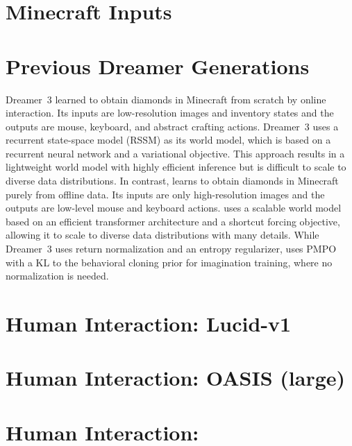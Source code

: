 \enlargethispage{\baselineskip}
\vspace*{-9ex}
\section{Minecraft Inputs}
\vspace*{-1ex}


\section{Previous Dreamer Generations}
\vspace*{-1ex}
Dreamer~3\citep{dreamerv3} learned to obtain diamonds in Minecraft from scratch by online interaction.
Its inputs are low-resolution images and inventory states and the outputs are mouse, keyboard, and abstract crafting actions.
Dreamer~3 uses a recurrent state-space model (RSSM) \citep{hafner2018planet} as its world model, which is based on a recurrent neural network and a variational objective.
This approach results in a lightweight world model with highly efficient inference but is difficult to scale to diverse data distributions.
In contrast, \method learns to obtain diamonds in Minecraft purely from offline data.
Its inputs are only high-resolution images and the outputs are low-level mouse and keyboard actions.
\method uses a scalable world model based on an efficient transformer architecture and a shortcut forcing objective, allowing it to scale to diverse data distributions with many details.
While Dreamer~3 uses return normalization and an entropy regularizer, \method uses PMPO with a KL to the behavioral cloning prior for imagination training, where no normalization is needed.
\vspace*{1ex}

\clearpage

\enlargethispage{\baselineskip}
\vspace*{-10ex}
\section{Human Interaction: Lucid-v1}
\vspace*{-2ex}

\vspace*{-2ex}
\clearpage

\enlargethispage{\baselineskip}
\vspace*{-10ex}
\section{Human Interaction: OASIS (large)}
\vspace*{-2ex}

\vspace*{-2ex}
\clearpage

\enlargethispage{\baselineskip}
\vspace*{-10ex}
\section{Human Interaction: \method}
\vspace*{-2ex}

\clearpage
